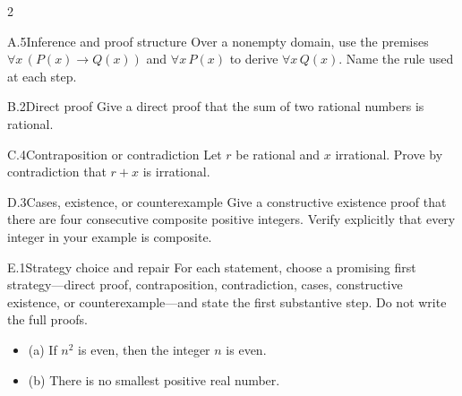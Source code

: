 \documentclass[9pt]{extarticle}
\begin{document}
\begin{multicols}{2}
\begin{CoreProblem}{A.5}{Inference and proof structure}
Over a nonempty domain, use the premises
$\forall x\,(P(x)\to Q(x))$ and $\forall x\,P(x)$ to derive
$\forall x\,Q(x)$. Name the rule used at each step.
\end{CoreProblem}
\begin{CoreProblem}{B.2}{Direct proof}
Give a direct proof that the sum of two rational numbers is rational.
\end{CoreProblem}
\begin{CoreProblem}{C.4}{Contraposition or contradiction}
Let $r$ be rational and $x$ irrational. Prove by contradiction that $r+x$ is irrational.
\end{CoreProblem}
\columnbreak
\begin{CoreProblem}{D.3}{Cases, existence, or counterexample}
Give a constructive existence proof that there are four consecutive composite
positive integers. Verify explicitly that every integer in your example is
composite.
\end{CoreProblem}
\begin{CoreProblem}{E.1}{Strategy choice and repair}
For each statement, choose a promising first strategy---direct proof,
contraposition, contradiction, cases, constructive existence, or
counterexample---and state the first substantive step. Do not write the full
proofs.
\begin{itemize}
  \item (a) If $n^2$ is even, then the integer $n$ is even.
  \item (b) There is no smallest positive real number.
\end{itemize}
\end{CoreProblem}
\end{multicols}
\CoreWorkArea
\FormBreak
{}
\end{document}
